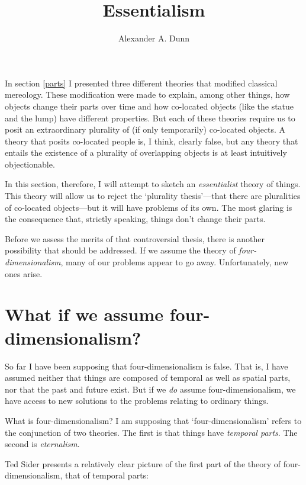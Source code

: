 \documentclass[11pt]{article}
\title{Essentialism}
\author{Alexander A. Dunn}
\begin{document}
\ifstandalone
\maketitle
\begin{spacing}{1.5}
\fi

\label{essential}

In section \ref{parts} I presented three different theories that
modified classical mereology.  These modification were made to
explain, among other things, how objects change their parts over time
and how co-located objects (like the statue and the lump) have
different properties.  But each of these theories require us to posit
an extraordinary plurality of (if only temporarily) co-located
objects.  A theory that posits co-located people is, I think, clearly
false, but any theory that entails the existence of a plurality of
overlapping objects is at least intuitively objectionable.

In this section, therefore, I will attempt to sketch an {\em
  essentialist} theory of things.  This theory will allow us to reject
the `plurality thesis'---that there are pluralities of co-located
objects---but it will have problems of its own.  The most glaring is
the consequence that, strictly speaking, things don't change their
parts.

Before we assess the merits of that controversial thesis, there is
another possibility that should be addressed.  If we assume the theory
of {\em four-dimensionalism}, many of our problems appear to go away.
Unfortunately, new ones arise.

\section{What if we assume four-dimensionalism?}
\label{4d}
So far I have been supposing that four-dimensionalism is false.  That
is, I have assumed neither that things are composed of temporal as
well as spatial parts, nor that the past and future exist.  But if we
{\em do} assume four-dimensionalism, we have access to new solutions
to the problems relating to ordinary things.

What is four-dimensionalism?  I am supposing that
`four-dimensionalism' refers to the conjunction of two theories.  The
first is that things have {\em temporal parts}.  The second is {\em
  eternalism}.

Ted Sider presents a relatively clear picture of the first part of the
theory of four-dimensionalism, that of temporal parts:


\end{spacing}
\end{document}

